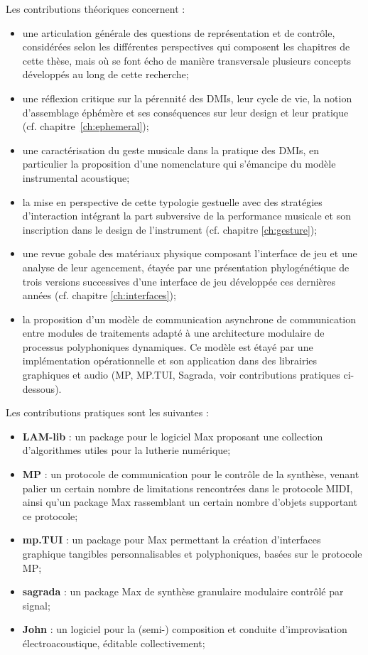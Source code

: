 Les contributions théoriques concernent :
\vspace{-1em}
\begin{itemize}[noitemsep]
\item une articulation générale des questions de représentation et de contrôle, considérées selon les différentes perspectives qui composent les chapitres de cette thèse, mais où se font écho de manière transversale plusieurs concepts développés au long de cette recherche;
\item une réflexion critique sur la pérennité des \glspl{DMI}, leur cycle de vie, la notion d'assemblage éphémère et ses conséquences sur leur design et leur pratique (cf. chapitre~\ref{ch:ephemeral});
\item une caractérisation du geste musicale dans la pratique des \glspl{DMI}, en particulier la proposition d'une nomenclature qui s'émancipe du modèle instrumental acoustique;
\item la mise en perspective de cette typologie gestuelle avec des stratégies d'interaction intégrant la part subversive de la performance musicale et son inscription dans le design de l'instrument (cf. chapitre \ref{ch:gesture});
\item une revue gobale des matériaux physique composant l'interface de jeu et une analyse de leur agencement, étayée par une présentation phylogénétique de trois versions successives d'une interface de jeu développée ces dernières années (cf. chapitre \ref{ch:interfaces});
\item la proposition d'un modèle de communication asynchrone de communication entre modules de traitements adapté à une architecture modulaire de processus polyphoniques dynamiques. Ce modèle est étayé par une implémentation opérationnelle et son application dans des librairies graphiques et audio  (MP, MP.TUI, Sagrada, voir contributions pratiques ci-dessous).
\end{itemize}

Les contributions pratiques sont les suivantes :
\vspace{-1em}
\begin{itemize}[noitemsep]
\item \textbf{LAM-lib} : un package pour le logiciel Max proposant une collection d'algorithmes utiles pour la lutherie numérique;
\item \textbf{MP} : un protocole de communication pour le contrôle de la synthèse, venant palier un certain nombre de limitations rencontrées dans le protocole MIDI, ainsi qu'un package Max rassemblant un certain nombre d'objets supportant ce protocole;
\item \textbf{mp.TUI} : un package pour Max permettant la création d'interfaces graphique tangibles personnalisables et polyphoniques, basées sur le protocole MP;
\item \textbf{sagrada} : un package Max de synthèse granulaire modulaire contrôlé par signal;
\item \textbf{John} : un logiciel pour la (semi-) composition et conduite d'improvisation électroacoustique, éditable collectivement;
\end{itemize}


